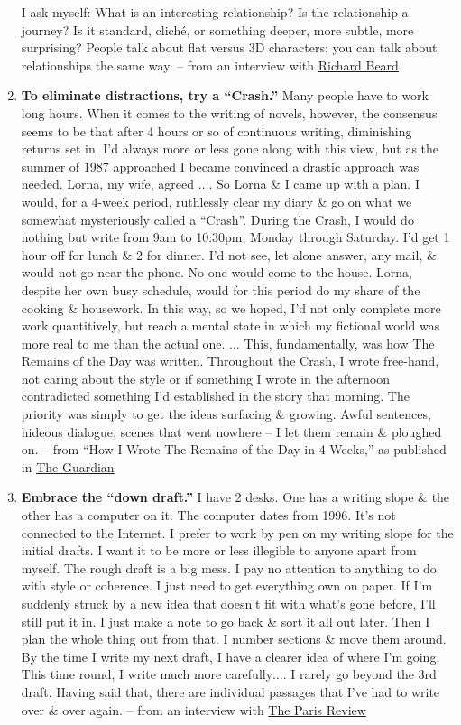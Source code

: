 \documentclass[oneside]{book}
\numberwithin{equation}{section}
\begin{document}
\begin{enumerate}
	I ask myself: What is an interesting relationship? Is the relationship a journey? Is it standard, clich\'e, or something deeper, more subtle, more surprising? People talk about flat versus 3D characters; you can talk about relationships the same way. -- from an interview with \href{https://holdenlee.wordpress.com/2014/02/18/kazuo-ishiguro-on-writing/}{Richard Beard}
	\item \textbf{To eliminate distractions, try a ``Crash.''} Many people have to work long hours. When it comes to the writing of novels, however, the consensus seems to be that after 4 hours or so of continuous writing, diminishing returns set in. I'd always more or less gone along with this view, but as the summer of 1987 approached I became convinced a drastic approach was needed. Lorna, my wife, agreed $\ldots$. So Lorna \& I came up with a plan. I would, for a 4-week period, ruthlessly clear my diary \& go on what we somewhat mysteriously called a ``Crash''. During the Crash, I would do nothing but write from 9am to 10:30pm, Monday through Saturday. I'd get 1 hour off for lunch \& 2 for dinner. I'd not see, let alone answer, any mail, \& would not go near the phone. No one would come to the house. Lorna, despite her own busy schedule, would for this period do my share of the cooking \& housework. In this way, so we hoped, I'd not only complete more work quantitively, but reach a mental state in which my fictional world was more real to me than the actual one. $\ldots$ This, fundamentally, was how The Remains of the Day was written. Throughout the Crash, I wrote free-hand, not caring about the style or if something I wrote in the afternoon contradicted something I'd established in the story that morning. The priority was simply to get the ideas surfacing \& growing. Awful sentences, hideous dialogue, scenes that went nowhere -- I let them remain \& ploughed on. -- from ``How I Wrote The Remains of the Day in 4 Weeks,'' as published in \href{https://www.theguardian.com/books/2014/dec/06/kazuo-ishiguro-the-remains-of-the-day-guardian-book-club}{The Guardian}
	\item \textbf{Embrace the ``down draft.''} I have 2 desks. One has a writing slope \& the other has a computer on it. The computer dates from 1996. It's not connected to the Internet. I prefer to work by pen on my writing slope for the initial drafts. I want it to be more or less illegible to anyone apart from myself. The rough draft is a big mess. I pay no attention to anything to do with style or coherence. I just need to get everything own on paper. If I'm suddenly struck by a new idea that doesn't fit with what's gone before, I'll still put it in. I just make a note to go back \& sort it all out later. Then I plan the whole thing out from that. I number sections \& move them around. By the time I write my next draft, I have a clearer idea of where I'm going. This time round, I write much more carefully$\ldots$. I rarely go beyond the 3rd draft. Having said that, there are individual passages that I've had to write over \& over again. -- from an interview with \href{https://www.theparisreview.org/interviews/5829/kazuo-ishiguro-the-art-of-fiction-no-196-kazuo-ishiguro}{The Paris Review}

\end{enumerate}
\end{document}
